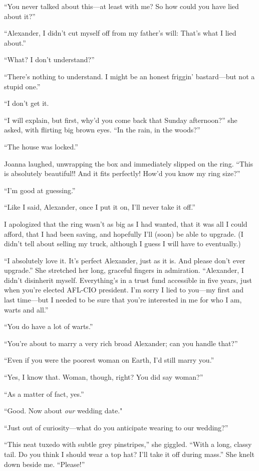 ``You never talked about this---at least with me? So how could you have
lied about it?''

``Alexander, I didn't cut myself off from my father's will: That's what
I lied about.''

``What? I don't understand?''

``There's nothing to understand. I might be an honest friggin'
bastard---but not a stupid one.''

``I don't get it.

``I will explain, but first, why'd you come back that Sunday
afternoon?'' she asked, with flirting big brown eyes. ``In the rain, in
the woods?''

``The house was locked.''

Joanna laughed, unwrapping the box and immediately slipped on the ring.
``This is absolutely beautiful!! And it fits perfectly! How'd you know
my ring size?''

``I'm good at guessing.''

``Like I said, Alexander, once I put it on, I'll never take it off.''

I apologized that the ring wasn't as big as I had wanted, that it was
all I could afford, that I had been saving, and hopefully I'll (soon) be
able to upgrade. (I didn't tell about selling my truck, although I guess
I will have to eventually.)

``I absolutely love it. It's perfect Alexander, just as it is. And
please don't ever upgrade.'' She stretched her long, graceful fingers in
admiration. ``Alexander, I didn't disinherit myself. Everything's in a
trust fund accessible in five years, just when you're elected AFL-CIO
president. I'm sorry I lied to you---my first and last time---but I
needed to be sure that you're interested in me for who I am, warts and
all.''

``You do have a lot of warts.''

``You're about to marry a very rich broad Alexander; can you handle
that?''

``Even if you were the poorest woman on Earth, I'd still marry you.''

``Yes, I know that. Woman, though, right? You did say woman?''

``As a matter of fact, yes.''

``Good. Now about \emph{our} wedding date."

``Just out of curiosity---what do you anticipate wearing to our
wedding?''

``This neat tuxedo with subtle grey pinstripes,'' she giggled. ``With a
long, classy tail. Do you think I should wear a top hat? I'll take it
off during mass.'' She knelt down beside me. ``Please!''

